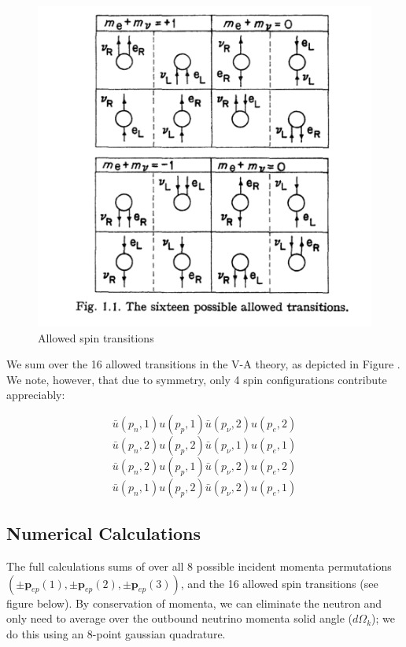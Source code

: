 \documentclass[%
 aip,
 jmp,%
 amsmath,amssymb,
 reprint,%
]{revtex4-1}
\begin{document}
\begin{figure}
   \includegraphics[scale=0.5]{img/16-allowed.png}
   \caption{Allowed spin transitions}
  \label{fig:SC}
\end{figure}
We sum over the 16  allowed transitions in the V-A theory, as depicted in Figure \cite{fig:SC}.
We note, however, that due to symmetry, only 4 spin configurations contribute appreciably:

$$\bar{u}(p_{n},1)u(p_{p},1)\bar{u}(p_{\nu},2)u(p_{e},2)$$
$$\bar{u}(p_{n},2)u(p_{p},2)\bar{u}(p_{\nu},1)u(p_{e},1)$$
$$\bar{u}(p_{n},2)u(p_{p},1)\bar{u}(p_{\nu},2)u(p_{e},2)$$
$$\bar{u}(p_{n},1)u(p_{p},2)\bar{u}(p_{\nu},2)u(p_{e},1)$$


\subsection{Numerical Calculations}

 The full calculations sums of over all 8 possible incident momenta permutations
  $(\pm\mathbf{p}_{ep}(1),\pm\mathbf{p}_{ep}(2),\pm\mathbf{p}_{ep}(3) )$,
and the 16 allowed spin transitions (see figure below). By conservation of momenta, we can eliminate the neutron and only need to average over the outbound neutrino momenta solid angle ($d\Omega_k$); we do this using an 8-point gaussian quadrature. 
\end{document}
